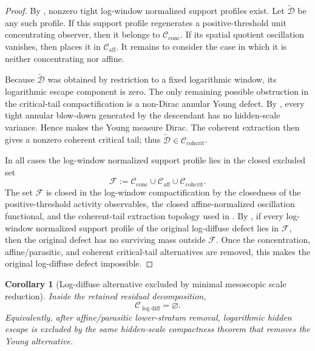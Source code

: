 \documentclass[11pt]{amsart}
\numberwithin{equation}{section}
\theoremstyle{plain}
\newtheorem{corollary}[corollary]{Corollary}
\theoremstyle{definition}
\theoremstyle{remark}
\newcommand{\Cactive}{\mathcal C_{\mathrm{conc}}}
\newcommand{\Caff}{\mathcal C_{\mathrm{aff}}}
\newcommand{\Ccohcrit}{\mathcal C_{\mathrm{cohcrit}}}
\newcommand{\Clogdiff}{\mathcal C_{\log\mathrm{diff}}}
\begin{document}
\begin{proof}
By
, nonzero tight log-window
normalized support profiles exist.  Let \(\widetilde{\mathcal D}\) be any such
profile.  If this support profile regenerates a
positive-threshold unit concentrating observer, then it belongs to \(\Cactive\).  If
its spatial quotient oscillation vanishes, then
 places it in \(\Caff\).  It remains
to consider the case in which it is neither concentrating nor affine.

Because \(\widetilde{\mathcal D}\) was obtained by restriction to a fixed
logarithmic window, its logarithmic escape component is zero.  The only
remaining possible obstruction in the critical-tail compactification is a
non-Dirac annular Young defect.  By
, every tight annular
blow-down generated by the descendant has no hidden-scale variance.  Hence
 makes the Young measure Dirac.
The coherent extraction
 then gives a nonzero coherent
critical tail; thus \(\widetilde{\mathcal D}\in\Ccohcrit\).

In all cases the log-window normalized support profile lies in the closed excluded set
\[
   \mathcal F:=\Cactive\cup\Caff\cup\Ccohcrit .
\]
The set \(\mathcal F\) is closed in the log-window compactification by the
closedness of the positive-threshold activity observables, the closed
affine-normalized oscillation functional, and the coherent-tail extraction
topology used in .
By , if every log-window normalized
support profile of the original log-diffuse defect lies in \(\mathcal F\), then the
original defect has no surviving mass outside \(\mathcal F\).  Once the concentration,
affine/parasitic, and coherent critical-tail alternatives are removed, this
makes the original log-diffuse defect impossible.
\end{proof}

\begin{corollary}[Log-diffuse alternative excluded by minimal mesoscopic scale reduction]
\label{cor:log-diffuse-branch-exclusion}
Inside the retained residual decomposition,
\[
   \Clogdiff=\varnothing .
\]
Equivalently, after affine/parasitic lower-stratum removal, logarithmic hidden
escape is excluded by the same hidden-scale compactness theorem that removes
the Young alternative.
\end{corollary}
\end{document}
